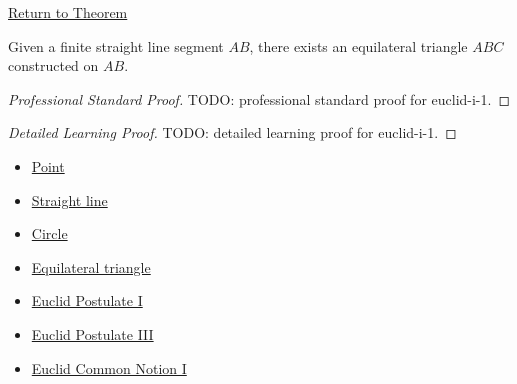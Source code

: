 \newpage
{}
\label{prf:euclid-i-1}

\begin{remark*}[Return]
\hyperref[thm:euclid-i-1]{Return to Theorem}
\end{remark*}

\begin{theorem*}
Given a finite straight line segment $AB$, there exists an equilateral
triangle $ABC$ constructed on $AB$.
\end{theorem*}

\begin{proof}[Professional Standard Proof]
\LRAProofBodyStart
TODO: professional standard proof for euclid-i-1.
\end{proof}

\begin{proof}[Detailed Learning Proof]
\LRAProofBodyStart
TODO: detailed learning proof for euclid-i-1.
\end{proof}

\begin{remark*}
\end{remark*}

\begin{dependencies}
\begin{itemize}
  \item \hyperref[def-euclid-point]{Point}
  \item \hyperref[def-euclid-straight-line]{Straight line}
  \item \hyperref[def-euclid-circle]{Circle}
  \item \hyperref[def-euclid-triangle-side-classes]{Equilateral triangle}
  \item \hyperref[ax-euclid-postulate-draw-straight-line]{Euclid Postulate I}
  \item \hyperref[ax-euclid-postulate-describe-circle]{Euclid Postulate III}
  \item \hyperref[ax-euclid-common-notion-things-equal-to-same]{Euclid Common Notion I}
\end{itemize}
\end{dependencies}

\clearpage
